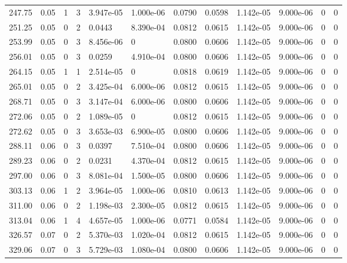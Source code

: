 \documentclass[preview]{standalone}
\begin{document}
{{{\begin{tabular}{L{1.2cm}C{1.2cm} C{0.3cm}C{0.5cm} C{1.4cm}C{1.4cm} C{1.4cm}C{1.4cm} C{1.6cm}C{1.6cm} C{1.6cm}C{1.6cm}}
  247.75  &  0.05  & 1     &  3 &  3.947e-05  & 1.000e-06  &  0.0790&   0.0598& 1.142e-05 & 9.000e-06   &  0 & 0  \\ 
  251.25  &  0.05  & 0     &  2 &  0.0443  & 8.390e-04  &  0.0812&   0.0615& 1.142e-05 & 9.000e-06   &  0 & 0  \\ 
  253.99  &  0.05  & 0     &  3 &  8.456e-06  & 0  &  0.0800&   0.0606& 1.142e-05 & 9.000e-06   &  0 & 0  \\ 
  256.01  &  0.05  & 0     &  3 &  0.0259  & 4.910e-04  &  0.0800&   0.0606& 1.142e-05 & 9.000e-06   &  0 & 0  \\ 
  264.15  &  0.05  & 1     &  1 &  2.514e-05  & 0  &  0.0818&   0.0619& 1.142e-05 & 9.000e-06   &  0 & 0  \\ 
  265.01  &  0.05  & 0     &  2 &  3.425e-04  & 6.000e-06  &  0.0812&   0.0615& 1.142e-05 & 9.000e-06   &  0 & 0  \\ 
  268.71  &  0.05  & 0     &  3 &  3.147e-04  & 6.000e-06  &  0.0800&   0.0606& 1.142e-05 & 9.000e-06   &  0 & 0  \\ 
  272.06  &  0.05  & 0     &  2 &  1.089e-05  & 0  &  0.0812&   0.0615& 1.142e-05 & 9.000e-06   &  0 & 0  \\ 
  272.62  &  0.05  & 0     &  3 &  3.653e-03  & 6.900e-05  &  0.0800&   0.0606& 1.142e-05 & 9.000e-06   &  0 & 0  \\ 
  288.11  &  0.06  & 0     &  3 &  0.0397  & 7.510e-04  &  0.0800&   0.0606& 1.142e-05 & 9.000e-06   &  0 & 0  \\ 
  289.23  &  0.06  & 0     &  2 &  0.0231  & 4.370e-04  &  0.0812&   0.0615& 1.142e-05 & 9.000e-06   &  0 & 0  \\ 
  297.00  &  0.06  & 0     &  3 &  8.081e-04  & 1.500e-05  &  0.0800&   0.0606& 1.142e-05 & 9.000e-06   &  0 & 0  \\ 
  303.13  &  0.06  & 1     &  2 &  3.964e-05  & 1.000e-06  &  0.0810&   0.0613& 1.142e-05 & 9.000e-06   &  0 & 0  \\ 
  311.00  &  0.06  & 0     &  2 &  1.198e-03  & 2.300e-05  &  0.0812&   0.0615& 1.142e-05 & 9.000e-06   &  0 & 0  \\ 
  313.04  &  0.06  & 1     &  4 &  4.657e-05  & 1.000e-06  &  0.0771&   0.0584& 1.142e-05 & 9.000e-06   &  0 & 0  \\ 
  326.57  &  0.07  & 0     &  2 &  5.370e-03  & 1.020e-04  &  0.0812&   0.0615& 1.142e-05 & 9.000e-06   &  0 & 0  \\ 
  329.06  &  0.07  & 0     &  3 &  5.729e-03  & 1.080e-04  &  0.0800&   0.0606& 1.142e-05 & 9.000e-06   &  0 & 0  \\ 

\end{tabular}}}}
\end{document}
